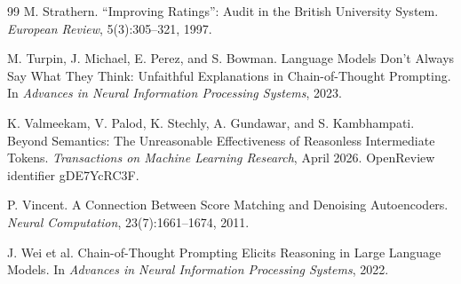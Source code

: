 \documentclass[11pt,twoside,openright]{book}
\theoremstyle{plain}
\theoremstyle{definition}
\theoremstyle{remark}
\begin{document}
\begin{thebibliography}{99}
M. Strathern.
\newblock ``Improving Ratings'': Audit in the British University System.
\newblock \emph{European Review}, 5(3):305--321, 1997.

M. Turpin, J. Michael, E. Perez, and S. Bowman.
\newblock Language Models Don't Always Say What They Think: Unfaithful Explanations in Chain-of-Thought Prompting.
\newblock In \emph{Advances in Neural Information Processing Systems}, 2023.

K. Valmeekam, V. Palod, K. Stechly, A. Gundawar, and S. Kambhampati.
\newblock Beyond Semantics: The Unreasonable Effectiveness of Reasonless Intermediate Tokens.
\newblock \emph{Transactions on Machine Learning Research}, April 2026. OpenReview identifier gDE7YcRC3F.

P. Vincent.
\newblock A Connection Between Score Matching and Denoising Autoencoders.
\newblock \emph{Neural Computation}, 23(7):1661--1674, 2011.

J. Wei et al.
\newblock Chain-of-Thought Prompting Elicits Reasoning in Large Language Models.
\newblock In \emph{Advances in Neural Information Processing Systems}, 2022.

\end{thebibliography}
\end{document}
